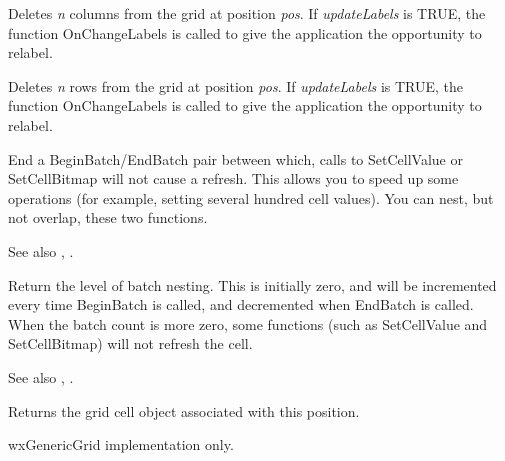 Deletes {\it n} columns from the grid at position {\it pos}. If {\it updateLabels} is TRUE,
the function OnChangeLabels is called to give the application the opportunity to relabel.

\label{wxgriddeleterows}


Deletes {\it n} rows from the grid at position {\it pos}. If {\it updateLabels} is TRUE,
the function OnChangeLabels is called to give the application the opportunity to relabel.

\label{wxgridendbatch}


End a BeginBatch/EndBatch pair between which, calls to SetCellValue or
SetCellBitmap will not cause a refresh. This allows you to speed up some operations
(for example, setting several hundred cell values). You can nest, but not overlap,
these two functions.

See also , .

\label{wxgridgetbatchcount}


Return the level of batch nesting. This is initially zero, and will be incremented
every time BeginBatch is called, and decremented when EndBatch is called. When the
batch count is more zero, some functions (such as SetCellValue and SetCellBitmap) will
not refresh the cell.

See also , .

\label{wxgridgetcell}


Returns the grid cell object associated with this position.

wxGenericGrid implementation only.

\label{wxgridgetcellalignment}



